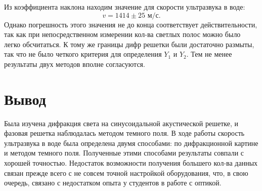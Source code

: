\documentclass[a4paper, 14pt]{extarticle}%
\begin{document}
Из коэффициента наклона находим значение для скорости ультразвука в воде:
\[v = 1414 \pm 25 \text{ м/с}. \]
Однако погрешность этого значения не до конца соответствует действительности, так как при непосредственном измерении кол-ва светлых полос можно было легко обсчитаться. К тому же границы дифр решетки были достаточно размыты, так что не было четкого критерия для определения $Y_1$ и $Y_2$. Тем не менее результаты двух методов вполне согласуются. 
 
\section*{Вывод}
Была изучена дифракция света на синусоидальной акустической решетке, и фазовая решетка наблюдалась методом темного поля. В ходе работы скорость ультразвука в воде была определена двумя способами: по дифракционной картине и методом темного поля. Полученные этими способами результаты совпали с хорошей точностью. Недостаток возможности получения большего кол-ва данных связан прежде всего с не совсем точной настройкой оборудования, что, в свою очередь, связано с недостатком опыта у студентов в работе с оптикой.
\end{document}
